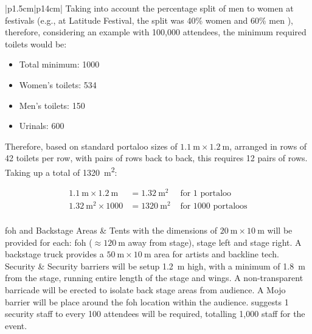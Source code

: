 \begin{longtable}{|p{1.5cm}|p{14cm}|}
                Taking into account the percentage split of men to women at festivals (e.g., at Latitude Festival, the split was 40\% women and 60\% men \citep{aawbi2019}), therefore, considering an example with 100,000 attendees, the minimum required toilets would be:
                
                \begin{itemize}
                    \item Total minimum: 1000
                    \item Women's toilets: 534
                    \item Men's toilets: 150
                    \item Urinals: 600
                \end{itemize}
                
                Therefore, based on standard portaloo sizes of $\SI{1.1}{\metre} \times \SI{1.2}{\metre}$, arranged in rows of 42 toilets per row, with pairs of rows back to back, this requires 12 pairs of rows. Taking up a total of \SI{1320}{\metre\squared}:

                \[
                    \begin{aligned}
                    \SI{1.1}{\metre} \times \SI{1.2}{\metre} &= \SI{1.32}{\metre\squared} &\text{ for 1 portaloo}\\
                    \SI{1.32}{\metre\squared} \times 1000 &= \SI{1320}{\metre\squared} &\text{ for 1000 portaloos}
                    \end{aligned}
                \]
            \\
            \hline
            \gls{foh} and Backstage Areas &
                Tents with the dimensions of $\SI{20}{\metre} \times \SI{10}{\metre}$ will be provided for each: \gls{foh} ($\approx \SI{120}{\metre}$ away from stage), stage left and stage right. A backstage truck provides a $\SI{50}{\metre} \times \SI{10}{\metre}$ area for artists and backline tech.
            \\
            \hline
            Security &
                Security barriers will be setup \SI{1.2}{\metre} high, with a minimum of \SI{1.8}{\metre} from the stage, running entire length of the stage and wings. A non-transparent barricade will be erected to isolate back stage areas from audience. A Mojo barrier will be place around the \gls{foh} location within the audience. \citet{westminster2023} suggests 1 security staff to every 100 attendees will be required, totalling 1,000 staff for the event.
            \\
            \hline

            \caption{Calculation of all amenities}
            \label{tab:amenities_calcs}
        \end{longtable}

